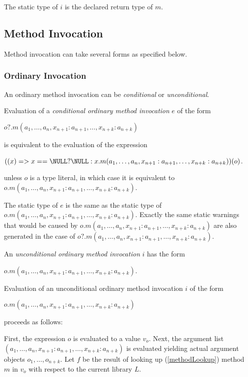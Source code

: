 \documentclass{article}
\begin{document}
\LMHash{}
The static type of $i$ is the declared return type of $m$.

\subsection{ Method Invocation}

\LMHash{}
Method invocation can take several forms as specified below.

\subsubsection{Ordinary Invocation}

\LMHash{}
An ordinary method invocation can be {\em conditional} or {\em unconditional}.

\LMHash{}
Evaluation of a {\em conditional ordinary method invocation} $e$ of the form

\LMHash{}
$o?.m(a_1, \ldots , a_n, x_{n+1}: a_{n+1}, \ldots , x_{n+k}: a_{n+k})$

\LMHash{}
is equivalent to the evaluation of the expression

\LMHash{}
$((x) => x == \NULL ? \NULL : x.m(a_1, \ldots , a_n, x_{n+1}: a_{n+1}, \ldots , x_{n+k}: a_{n+k}))(o)$.

unless $o$ is  a type literal, in which case it is equivalent to $o.m(a_1, \ldots , a_n, x_{n+1}: a_{n+1}, \ldots , x_{n+k}: a_{n+k})$.

\LMHash{}
The static type of $e$ is the same as the static type of $o.m(a_1, \ldots , a_n, x_{n+1}: a_{n+1}, \ldots , x_{n+k}: a_{n+k})$. Exactly the same static warnings that would be caused by $o.m(a_1, \ldots , a_n, x_{n+1}: a_{n+1}, \ldots , x_{n+k}: a_{n+k})$ are also generated in the case of $o?.m(a_1, \ldots , a_n, x_{n+1}: a_{n+1}, \ldots , x_{n+k}: a_{n+k})$.

\LMHash{}
An {\em unconditional ordinary method invocation} $i$ has the form

$o.m(a_1, \ldots , a_n, x_{n+1}: a_{n+1}, \ldots , x_{n+k}: a_{n+k})$.

\LMHash{}
Evaluation of an unconditional ordinary method invocation $i$ of the form

$o.m(a_1, \ldots , a_n, x_{n+1}: a_{n+1}, \ldots , x_{n+k}: a_{n+k})$

proceeds as follows:

\LMHash{}
First, the expression $o$ is evaluated to a value $v_o$. Next, the argument list $(a_1, \ldots , a_n, x_{n+1}: a_{n+1}, \ldots , x_{n+k}: a_{n+k})$ is evaluated yielding actual argument objects $o_1, \ldots , o_{n+k}$. Let $f$ be the result of looking up (\ref{methodLookup}) method $m$  in $v_o$ with respect to the current library $L$.
\end{document}
